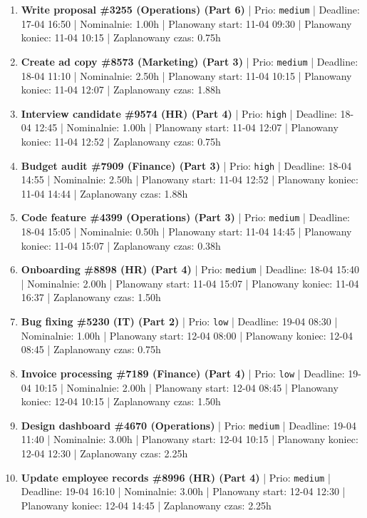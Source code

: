 {\begin{enumerate}
  \item [\textbf{14654}] \textbf{Write proposal \#3255 (Operations) (Part 6)} | Prio: \texttt{medium} | Deadline: 17-04 16:50 | Nominalnie: 1.00h | Planowany start: 11-04 09:30 | Planowany koniec: 11-04 10:15 | Zaplanowany czas: 0.75h
  \item [\textbf{14677}] \textbf{Create ad copy \#8573 (Marketing) (Part 3)} | Prio: \texttt{medium} | Deadline: 18-04 11:10 | Nominalnie: 2.50h | Planowany start: 11-04 10:15 | Planowany koniec: 11-04 12:07 | Zaplanowany czas: 1.88h
  \item [\textbf{14612}] \textbf{Interview candidate \#9574 (HR) (Part 4)} | Prio: \texttt{high} | Deadline: 18-04 12:45 | Nominalnie: 1.00h | Planowany start: 11-04 12:07 | Planowany koniec: 11-04 12:52 | Zaplanowany czas: 0.75h
  \item [\textbf{14616}] \textbf{Budget audit \#7909 (Finance) (Part 3)} | Prio: \texttt{high} | Deadline: 18-04 14:55 | Nominalnie: 2.50h | Planowany start: 11-04 12:52 | Planowany koniec: 11-04 14:44 | Zaplanowany czas: 1.88h
  \item [\textbf{14664}] \textbf{Code feature \#4399 (Operations) (Part 3)} | Prio: \texttt{medium} | Deadline: 18-04 15:05 | Nominalnie: 0.50h | Planowany start: 11-04 14:45 | Planowany koniec: 11-04 15:07 | Zaplanowany czas: 0.38h
  \item [\textbf{14636}] \textbf{Onboarding \#8898 (HR) (Part 4)} | Prio: \texttt{medium} | Deadline: 18-04 15:40 | Nominalnie: 2.00h | Planowany start: 11-04 15:07 | Planowany koniec: 11-04 16:37 | Zaplanowany czas: 1.50h
  \item [\textbf{14680}] \textbf{Bug fixing \#5230 (IT) (Part 2)} | Prio: \texttt{low} | Deadline: 19-04 08:30 | Nominalnie: 1.00h | Planowany start: 12-04 08:00 | Planowany koniec: 12-04 08:45 | Zaplanowany czas: 0.75h
  \item [\textbf{14678}] \textbf{Invoice processing \#7189 (Finance) (Part 4)} | Prio: \texttt{low} | Deadline: 19-04 10:15 | Nominalnie: 2.00h | Planowany start: 12-04 08:45 | Planowany koniec: 12-04 10:15 | Zaplanowany czas: 1.50h
  \item [\textbf{14676}] \textbf{Design dashboard \#4670 (Operations)} | Prio: \texttt{medium} | Deadline: 19-04 11:40 | Nominalnie: 3.00h | Planowany start: 12-04 10:15 | Planowany koniec: 12-04 12:30 | Zaplanowany czas: 2.25h
  \item [\textbf{14655}] \textbf{Update employee records \#8996 (HR) (Part 4)} | Prio: \texttt{medium} | Deadline: 19-04 16:10 | Nominalnie: 3.00h | Planowany start: 12-04 12:30 | Planowany koniec: 12-04 14:45 | Zaplanowany czas: 2.25h

\end{enumerate}}
